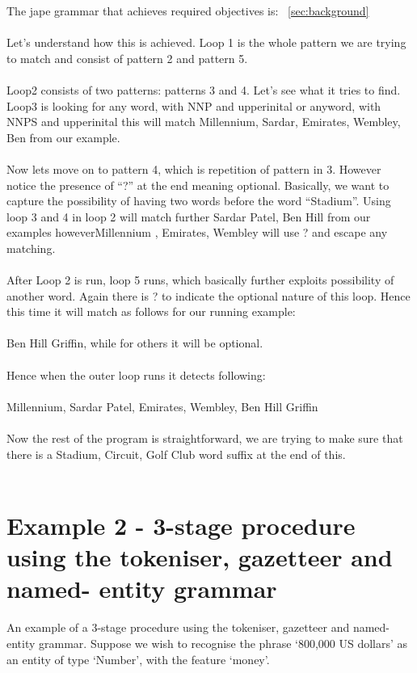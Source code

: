 \documentclass[a4paper,12pt]{report}
\begin{document}
The jape grammar that achieves required objectives is: ~\ref{sec:background}
\\\\
Let’s understand how this is achieved. Loop 1 is the whole pattern we are trying to match and consist of pattern 2 and pattern 5. 
\\\\
Loop2 consists of two patterns: patterns 3 and 4. Let’s see what it tries to find. Loop3 is looking for {any word, with NNP and upperinital or anyword, with NNPS and upperinital} this will match {Millennium, Sardar, Emirates, Wembley, Ben} from our example.
\\\\
Now lets move on to pattern 4, which is repetition of pattern in 3. However notice the presence of “?” at the end meaning optional. Basically, we want to capture the possibility of having two words before the word “Stadium”. Using loop 3 and 4 in loop 2 will match further { Sardar Patel, Ben Hill} from our examples however{Millennium , Emirates, Wembley} will use ? and escape any matching.
\\\\
After Loop 2 is run, loop 5 runs, which basically further exploits possibility of another word. Again there is ? to indicate the optional nature of this loop. Hence this time it will match as follows for our running example: 
\\\\
{Ben Hill Griffin}, while for others it will be optional.
\\\\
Hence when the outer loop runs it detects following:
\\\\
{Millennium, Sardar Patel, Emirates, Wembley, Ben Hill Griffin}
\\\\
Now the rest of the program is straightforward, we are trying to make sure that there is a {Stadium, Circuit, Golf Club} word suffix at the end of this.
\\\\


\section{Example 2 - 3-stage procedure using the tokeniser, gazetteer and named-
entity grammar}


An example of a 3-stage procedure using the tokeniser, gazetteer and named-
entity grammar. Suppose we wish to recognise the phrase ‘800,000 US dollars’ as an entity
of type ‘Number’, with the feature ‘money’.
\end{document}
